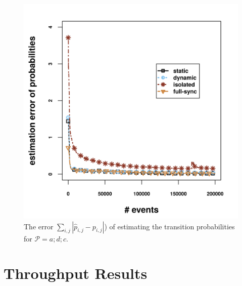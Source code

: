 \begin{figure}[H]
	\centering
	\includegraphics[width=\textwidth,keepaspectratio]{chapters/figures/synthetic/new/error_synthetic.png}
	
	\caption{The error  $\sum_{i,j} |\hat{p}_{i,j} - {p}_{i,j}|$) of estimating the transition probabilities  for $\mathcal{P}=a;d;c$.}
	\label{fig:error_synthetic}
\end{figure}




 
\section{Throughput Results}
\label{sec:throughput}

